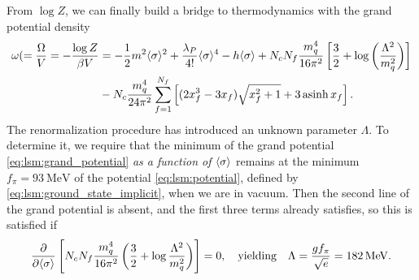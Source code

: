 From $\log Z$, we can finally build a bridge to thermodynamics with the grand potential density
\begin{equation}
\begin{split}
	\omega( = \frac{\Omega}{V} = -\frac{\log Z}{\beta V} &= -\frac12 m^2 \langle \sigma \rangle^2 + \frac{\lambda_P}{4!} \langle \sigma \rangle^4 - h \langle \sigma \rangle + N_c N_f \frac{m_q^4}{16 \pi^2} \left[ \frac{3}{2} + \log\left(\frac{{\Lambda}^2}{m_q^2}\right) \right] \\
	                                                    &- N_c \frac{m_q^4}{24 \pi^2} \sum_{f=1}^{N_f} \left[ (2 x_f^3 - 3x_f) \sqrt{x_f^2 + 1} + 3 \operatorname{asinh} x_f \right] .
\end{split}
\label{eq:lsm:grand_potential}
\end{equation}
The renormalization procedure has introduced an unknown parameter $\Lambda$.
To determine it, we require that the minimum of the grand potential \eqref{eq:lsm:grand_potential} \emph{as a function of $\langle \sigma \rangle$} remains at the minimum $f_\pi = \SI{93}{\mega\electronvolt}$ of the potential \eqref{eq:lsm:potential}, defined by \eqref{eq:lsm:ground_state_implicit}, when we are in vacuum.
Then the second line of the grand potential is absent, and the first three terms already satisfies, so this is satisfied if
\begin{equation}
	\pdv*{\left[ N_c N_f \frac{m_q^4}{16 \pi^2} \left( \frac32 + \log \frac{\Lambda^2}{m_q^2} \right) \right] }{\langle \sigma \rangle} = 0,
	\quad \text{yielding} \quad
	\Lambda = \frac{g f_\pi}{\sqrt{e}} = \SI{182}{\mega\electronvolt}.
\label{eq:lsm:potential_vacuum_minimum}
\end{equation}

